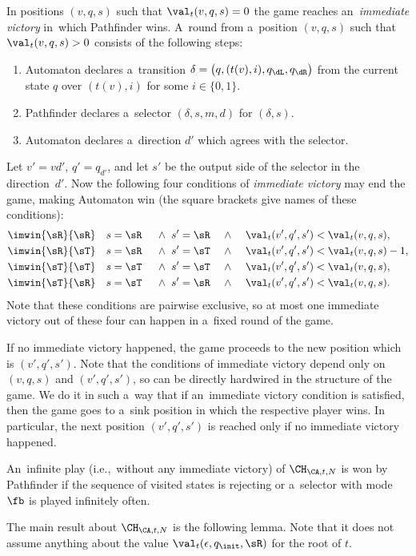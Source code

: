 In positions $(v,q,s)$ such that $\val_t(v,q,s)=0$ the game reaches an~\emph{immediate victory} in~which Pathfinder wins.
A~round from a~position $(v,q,s)$ such that $\val_t(v,q,s)>0$ consists of the following steps:
\begin{enumerate}
\item Automaton declares a~transition $\delta=\big(q,(t(v),i),q_\dL,q_\dR\big)$ from the current state $q$ over $(t(v),i)$ for some $i\in\{0,1\}$.
\item Pathfinder declares a~selector $(\delta,s,m,d)$ for $(\delta,s)$.
\item Automaton declares a~direction $d'$ which agrees with the selector.
\end{enumerate}
\noindent %
Let $v'=vd'$, $q'=q_{d'}$, and let $s'$ be the output side of the selector in the direction~$d'$.
Now the following four conditions of \emph{immediate victory} may end the game, making Automaton win (the square brackets give names of these conditions):
\begin{alignat*}{8}
\imwin{\sR}{\sR}\quad&s=\sR &&\ \land\ s'=\sR &&\ \land\ && \val_t(v',q',s')< \val_t(v,q,s),\\
\imwin{\sR}{\sT}\quad&s=\sR &&\ \land\ s'=\sT &&\ \land\ && \val_t(v',q',s')< \val_t(v,q,s)-1,\\
\imwin{\sT}{\sT}\quad&s=\sT &&\ \land\ s'=\sT &&\ \land\ && \val_t(v',q',s')< \val_t(v,q,s),\\
\imwin{\sT}{\sR}\quad&s=\sT &&\ \land\ s'=\sR &&\ \land\ && \val_t(v',q',s')< \val_t(v,q,s).
\end{alignat*}
Note that these conditions are pairwise exclusive, so at most one immediate victory out of these four can happen in a~fixed round of the game.

If no immediate victory happened, the game proceeds to the new position which is $(v',q',s')$.
Note that the conditions of immediate victory depend only on $(v,q,s)$ and $(v',q',s')$, so can be directly hardwired in the structure of the game.
We do it in such a~way that if an~immediate victory condition is satisfied, then the game goes to a~sink position in which the respective player wins.
In particular, the next position $(v',q',s')$ is reached only if no immediate victory happened.

An~infinite play (i.e.,~without any immediate victory) of $\CH_{\CA,t,N}$ is won by Pathfinder if the sequence of visited states is rejecting or a~selector with mode $\fb$ is played infinitely often.

The main result about $\CH_{\CA,t,N}$ is the following lemma.
Note that it does not assume anything about the value $\val_t(\epsilon,q_\init,\sR)$ for the root of $t$.

